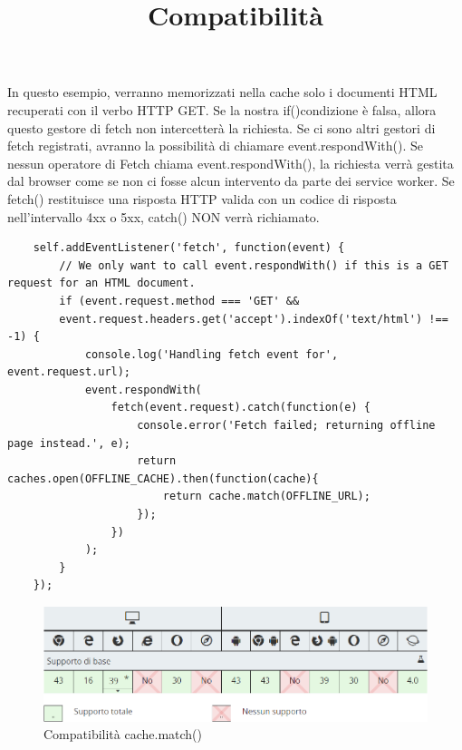 \documentclass[italian]{article}
\begin{document}
\begin{itemize}
	In questo esempio, verranno memorizzati nella cache solo i documenti HTML recuperati con il verbo HTTP GET. Se la nostra if()condizione è falsa, allora questo gestore di fetch non intercetterà la richiesta. Se ci sono altri gestori di fetch registrati, avranno la possibilità di chiamare event.respondWith(). Se nessun operatore di Fetch chiama event.respondWith(), la richiesta verrà gestita dal browser come se non ci fosse alcun intervento da parte dei service worker. Se  fetch() restituisce una risposta HTTP valida con un codice di risposta nell'intervallo 4xx o 5xx,  catch() NON verrà richiamato.
	\pagebreak
	\begin{lstlisting}
	self.addEventListener('fetch', function(event) {
		// We only want to call event.respondWith() if this is a GET request for an HTML document.
		if (event.request.method === 'GET' &&
		event.request.headers.get('accept').indexOf('text/html') !== -1) {
			console.log('Handling fetch event for', event.request.url);
			event.respondWith(
				fetch(event.request).catch(function(e) {
					console.error('Fetch failed; returning offline page instead.', e);
					return caches.open(OFFLINE_CACHE).then(function(cache){
						return cache.match(OFFLINE_URL);
					});
				})
			);
		}
	});
	\end{lstlisting} 
	\title{\textbf{Compatibilità}}
	\begin{figure}[h]
		\centering
		\includegraphics[width=1\linewidth]{c1}
		\caption{Compatibilità cache.match()}
		\label{fig:Compatibilità cache.match()}
	\end{figure}




\end{itemize}
\end{document}
